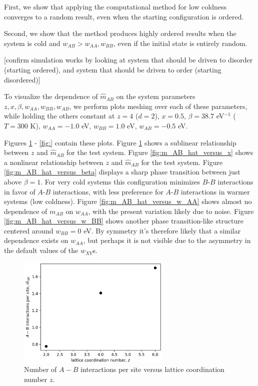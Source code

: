 \documentclass[10pt]{article}
\begin{document}
First, we show that applying the computational method for low coldness converges to a random result, even when the starting configuration is ordered.

Second, we show that the method produces highly ordered results when the system is cold and $w_{AB} > w_{AA},w_{BB}$, even if the initial state is entirely random.

[confirm simulation works by looking at system that should be driven to disorder (starting ordered), and system that should be driven to order (starting disordered)]


To visualize the dependence of $\hat{m}_{AB}$ on the system parameters $z,x,\beta,w_{AA},w_{BB},w_{AB}$, we perform plots meshing over each of these parameters, while holding the others constant at $z=4$ ($d = 2$), $x = 0.5$, $\beta = 38.7$ eV$^{-1}$ ($T = 300$ K), $w_{AA} = -1.0$ eV, $w_{BB} = 1.0$ eV, $w_{AB} = -0.5$ eV.

Figures \ref{fig:m_AB_hat_versus_z} - \ref{fig:} contain these plots.
Figure \ref{fig:m_AB_hat_versus_z} shows a sublinear relationship between $z$ and $\hat{m}_{AB}$ for the test system.
Figure \ref{fig:m_AB_hat_versus_x} shows a nonlinear relationship between $z$ and $\hat{m}_{AB}$ for the test system.
Figure \ref{fig:m_AB_hat_versus_beta} displays a sharp phase transition between just above $\beta = 1$. For very cold systems this configuration minimizes $B$-$B$ interactions in favor of $A$-$B$ interactions, with less preference for $A$-$B$ interactions in warmer systems (low coldness).
Figure \ref{fig:m_AB_hat_versus_w_AA} shows almost no dependence of $m_{AB}$ on $w_{AA}$, with the present variation likely due to noise.
Figure \ref{fig:m_AB_hat_versus_w_BB} shows another phase transition-like structure centered around $w_{BB}=0$ eV.
By symmetry it's therefore likely that a similar dependence exists on $w_{AA}$, but perhaps it is not visible due to the asymmetry in the default values of the $w_{XY}$s.

\begin{figure}[h!]
\centering
\includegraphics[width=0.65\textwidth]{Figures/m_AB_hat_versus_z.png}
\caption{Number of $A-B$ interactions per site versus lattice coordination number $z$.}
\label{fig:m_AB_hat_versus_z}
\end{figure}
\end{document}
